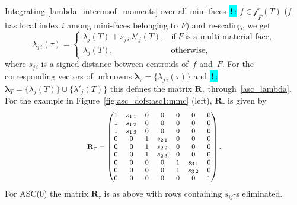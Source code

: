 \documentclass[12pt]{article}
\newcommand{\vect}[1]{\boldsymbol{\mathbf{#1}}}
\newcommand{\bcell}{T}
\newcommand{\mmesh}{{\vect{\mathcal \tau}}}
\newcommand{\bface}{F}
\newcommand{\bfaces}[1][]{{\vect{\mathcal F}_{\text{#1}}}}
\newcommand{\mfaces}[1][]{{\vect{\mathcal f}_{\text{#1}}}}
\newcommand{\toDiscuss}[1]{\colorbox{Cyan}{\textbf{\,!\,}:} #1}
\begin{document}
Integrating \eqref{lambda_intermsof_moments} over all mini-faces \toDiscuss{$f \in \mfaces_\bface(\bcell)$} ($f$ has local index $i$ among mini-faces belonging to $F$) and re-scaling, we get
\begin{equation}\label{asc1_interp}
	\lambda_{j\,i}(\mmesh) =
	\begin{cases}
		\lambda_{j}(\bcell) +  s_{j\,i}\,\lambda'_{j}(\bcell), & \text{if}~F~\text{is a multi-material face}, \\
		\lambda_{j}(\bcell),                                   & \text{otherwise},
	\end{cases}
\end{equation}
where $s_{j\,i} $ is a signed distance between centroids of~$f$  and~$F$. For the corresponding vectors of unknowns  ${\vect \lambda}_\mmesh = \{ \lambda_{j\,i}(\mmesh) \}$ and \toDiscuss{${\vect \lambda}_\bcell = \{ \lambda_{j}(\bcell) \} \cup \{ \lambda'_{j}(\bcell) \}$} this defines
the matrix $\vect R_\mmesh$ through~\eqref{asc_lambda}. For the example in Figure~\ref{fig:asc_dofs:asc1:mmc} (left), $\vect R_\mmesh$ is given by
\begin{equation*}\footnotesize
	\vect R_\mmesh
		=
		 \begin{pmatrix}
			1 &  s_{1\,1} & 0 & 0 & 0 & 0 & 0 \\
			1 &  s_{1\,2} & 0 & 0 & 0 & 0 & 0 \\
			1 &  s_{1\,3} & 0 & 0 & 0 & 0 & 0 \\
			0 & 0 & 1 &  s_{2\,1} & 0 & 0 & 0 \\
			0 & 0 & 1 &  s_{2\,2} & 0 & 0 & 0 \\
			0 & 0 & 1 &  s_{2\,3} & 0 & 0 & 0 \\
			0 & 0 & 0 & 0 & 1 &  s_{3\,1} & 0 \\
			0 & 0 & 0 & 0 & 1 &  s_{3\,2} & 0 \\
			0 & 0 & 0 & 0 & 0 & 0 & 1
		\end{pmatrix}.		
	\end{equation*}
For ASC(0) the matrix $\vect R_\mmesh$  is as above with rows containing $s_{ij}$-s eliminated.
	
\end{document}
